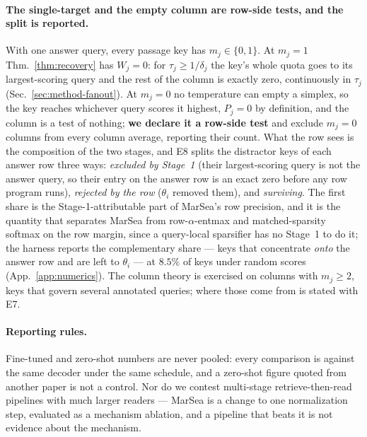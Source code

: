 \documentclass{article}
\begin{document}
\paragraph{The single-target and the empty column are row-side tests, and the split is
reported.} With one answer query, every passage key has $m_j\in\{0,1\}$. At $m_j=1$
Thm.~\ref{thm:recovery} has $W_j=0$: for $\tau_j\ge1/\delta_j$ the key's whole quota goes to its
largest-scoring query and the rest of the column is exactly zero, continuously in $\tau_j$
(Sec.~\ref{sec:method-fanout}). At $m_j=0$ no temperature can empty a simplex, so the key reaches
whichever query scores it highest, $P_j=0$ by definition, and the column is a test of nothing;
\textbf{we declare it a row-side test} and exclude $m_j=0$ columns from every column average,
reporting their count. What the row sees is the composition of the two stages, and E8 splits the
distractor keys of each answer row three ways: \emph{excluded by Stage~1} (their largest-scoring
query is not the answer query, so their entry on the answer row is an exact zero before any row
program runs), \emph{rejected by the row} ($\theta_i$ removed them), and \emph{surviving}. The
first share is the Stage-1-attributable part of MarSea's row precision, and it is the quantity
that separates MarSea from row-$\alpha$-entmax and matched-sparsity softmax on the row margin,
since a query-local sparsifier has no Stage~1 to do it; the harness reports the complementary
share --- keys that concentrate \emph{onto} the answer row and are left to $\theta_i$ --- at
$8.5\%$ of keys under random scores (App.~\ref{app:numerics}). The column theory is exercised on
columns with $m_j\ge2$, keys that govern several annotated queries; where those come from is
stated with E7.

\paragraph{Reporting rules.} Fine-tuned and zero-shot numbers are never pooled: every
comparison is against the same decoder under the same schedule, and a zero-shot figure quoted
from another paper is not a control. Nor do we contest multi-stage retrieve-then-read pipelines
with much larger readers --- MarSea is a change to one normalization step, evaluated as a
mechanism ablation, and a pipeline that beats it is not evidence about the mechanism.
\end{document}
